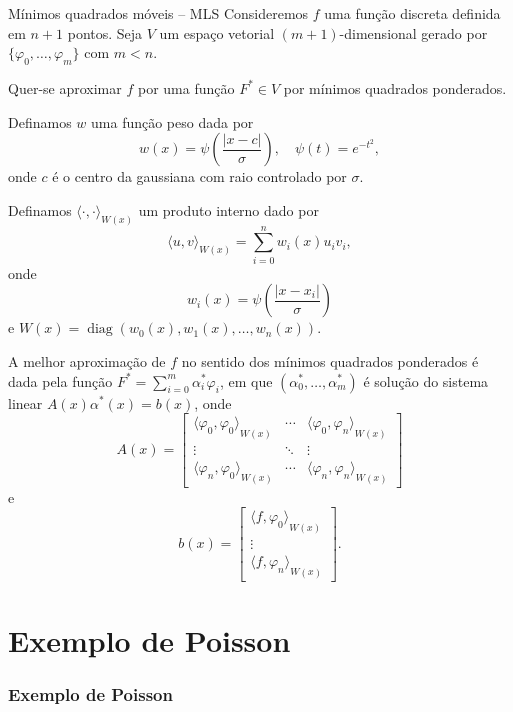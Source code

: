 \documentclass[../main/main.tex]{subfiles}
\begin{document}
\begin{frame}{Mínimos quadrados móveis -- MLS}
	Consideremos $f$ uma função discreta definida em $n+1$ pontos. Seja $V$ um espaço vetorial $(m+1)$-dimensional gerado por $\{\varphi_0,\dotsc,\varphi_m\}$ com $m < n$.\pause

	Quer-se aproximar $f$ por uma função $F^*\in V$ por mínimos quadrados ponderados.\pause

	Definamos $w$ uma função peso dada por\[
		w(x) = \psi\left(\frac{|x - c|}{\sigma}\right),\quad \psi(t) = e^{-t^2},
	\] onde $c$ é o centro da gaussiana com raio controlado por $\sigma$.
\end{frame}

\begin{frame}
	Definamos ${\langle\cdot,\cdot\rangle}_{W(x)}$ um produto interno dado por\[
		{\langle u,v\rangle}_{W(x)} = \sum_{i=0}^n w_i(x)u_i v_i,
	\] onde\[
		w_i(x) = \psi\left(\frac{|x - x_i|}{\sigma}\right)
	\] e $W(x) = \operatorname{diag}(w_0(x),w_1(x),\dotsc,w_n(x))$.
\end{frame}

\begin{frame}
	A melhor aproximação de $f$ no sentido dos mínimos quadrados ponderados é dada pela função $F^* = \sum_{i=0}^m \alpha_i^*\varphi_i$, em que $(\alpha_0^*,\dotsc,\alpha_m^*)$ é solução do sistema linear $A(x)\alpha^*(x) = b(x)$, onde\[
		A(x) = \begin{bmatrix}
			{\langle\varphi_0,\varphi_0\rangle}_{W(x)} & \cdots & {\langle\varphi_0,\varphi_n\rangle}_{W(x)} \\
			\vdots                                     & \ddots & \vdots                                     \\
			{\langle\varphi_n,\varphi_0\rangle}_{W(x)} & \cdots & {\langle\varphi_n,\varphi_n\rangle}_{W(x)}
		\end{bmatrix}
	\]
	e\[
		b(x) = \begin{bmatrix}
			{\langle f,\varphi_0\rangle}_{W(x)} \\
			\vdots                              \\
			{\langle f,\varphi_n\rangle}_{W(x)}
		\end{bmatrix}.
	\]
\end{frame}

\section{Exemplo de Poisson}


\begin{frame}
	\frametitle{Exemplo de Poisson}
\end{frame}
\end{document}
